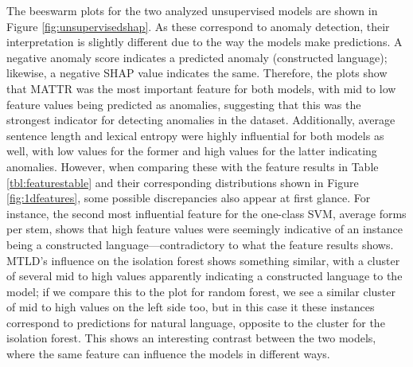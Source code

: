 \documentclass[12pt,a4paper]{article}
\numberwithin{figure}{section}
\numberwithin{table}{section}
\numberwithin{definition}{section}
\begin{document}
The beeswarm plots for the two analyzed unsupervised models are shown in Figure \ref{fig:unsupervisedshap}. As these correspond to anomaly detection, their interpretation is slightly different due to the way the models make predictions. A negative anomaly score indicates a predicted anomaly (constructed language); likewise, a negative SHAP value indicates the same. Therefore, the plots show that MATTR was the most important feature for both models, with mid to low feature values being predicted as anomalies, suggesting that this was the strongest indicator for detecting anomalies in the dataset. Additionally, average sentence length and lexical entropy were highly influential for both models as well, with low values for the former and high values for the latter indicating anomalies. However, when comparing these with the feature results in Table \ref{tbl:featurestable} and their corresponding distributions shown in Figure \ref{fig:1dfeatures}, some possible discrepancies also appear at first glance. For instance, the second most influential feature for the one-class SVM, average forms per stem, shows that high feature values were seemingly indicative of an instance being a constructed language---contradictory to what the feature results shows. MTLD's influence on the isolation forest shows something similar, with a cluster of several mid to high values apparently indicating a constructed language to the model; if we compare this to the plot for random forest, we see a similar cluster of mid to high values on the left side too, but in this case it these instances correspond to predictions for natural language, opposite to the cluster for the isolation forest. This shows an interesting contrast between the two models, where the same feature can influence the models in different ways.


\end{document}

